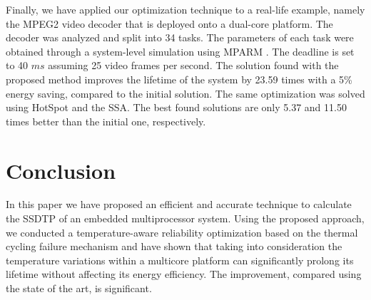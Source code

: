 Finally, we have applied our optimization technique to a real-life example,
namely the MPEG2 video decoder \cite{ffmpeg2011} that is deployed onto a
dual-core platform. The decoder was analyzed and split into 34 tasks. The
parameters of each task were obtained through a system-level simulation using
MPARM \cite{benini2005}. The deadline is set to 40 $ms$ assuming 25 video frames
per second. The solution found with the proposed method improves the lifetime of
the system by 23.59 times with a 5\% energy saving, compared to the initial
solution. The same optimization was solved using HotSpot and the SSA. The best
found solutions are only 5.37 and 11.50 times better than the initial one,
respectively.

\section{Conclusion}

In this paper we have proposed an efficient and accurate technique to calculate
the SSDTP of an embedded multiprocessor system. Using the proposed approach, we
conducted a temperature-aware reliability optimization based on the thermal
cycling failure mechanism and have shown that taking into consideration the
temperature variations within a multicore platform can significantly prolong its
lifetime without affecting its energy efficiency. The improvement, compared
using the state of the art, is significant.
